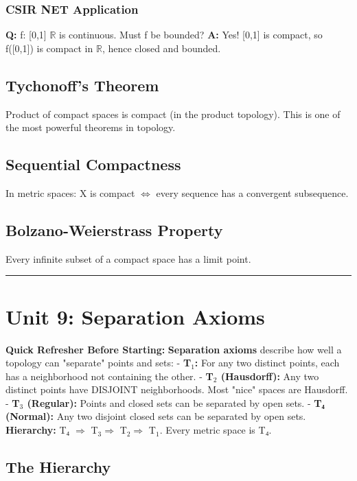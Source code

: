 \documentclass[12pt,a4paper,openany]{book}
\begin{document}
{{\subsubsection{ CSIR NET Application}
\textbf{Q:} f: [0,1]  $\mathbb{R}$ is continuous. Must f be bounded?
\textbf{A:} Yes! [0,1] is compact, so f([0,1]) is compact in $\mathbb{R}$, hence closed and bounded.

\subsection{Tychonoff's Theorem}
Product of compact spaces is compact (in the product topology). This is one of the most powerful theorems in topology.

\subsection{Sequential Compactness}
In metric spaces: X is compact $\Longleftrightarrow$ every sequence has a convergent subsequence.

\subsection{Bolzano-Weierstrass Property}
Every infinite subset of a compact space has a limit point.

\bigskip\noindent\rule{\textwidth}{0.4pt}\bigskip

\section{Unit 9: Separation Axioms}

\begin{prereqbox}
 \textbf{Quick Refresher Before Starting:}
\textbf{Separation axioms} describe how well a topology can "separate" points and sets:
- \textbf{T$_1$:} For any two distinct points, each has a neighborhood not containing the other.
- \textbf{T$_2$ (Hausdorff):} Any two distinct points have DISJOINT neighborhoods. Most "nice" spaces are Hausdorff.
- \textbf{T$_3$ (Regular):} Points and closed sets can be separated by open sets.
- \textbf{T₄ (Normal):} Any two disjoint closed sets can be separated by open sets.
\textbf{Hierarchy:} T₄ $\Longrightarrow$ T$_3\Longrightarrow$ T$_2\Longrightarrow$ T$_1$. Every metric space is T₄.
\end{prereqbox}


\subsection{The Hierarchy }

}}
\end{document}
